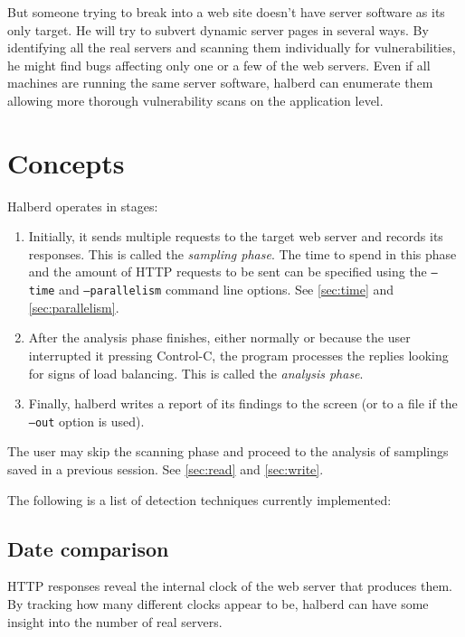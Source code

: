 \documentclass[a4paper]{book}
\begin{document}
But someone trying to break into a web site doesn't have server software as its
only target. He will try to subvert dynamic server pages in several ways.  By
identifying all the real servers and scanning them individually for
vulnerabilities, he might find bugs affecting only one or a few of the web
servers. Even if all machines are running the same server software, halberd can
enumerate them allowing more thorough vulnerability scans on the application
level.

\chapter{Concepts}

Halberd operates in stages:

\begin{enumerate}
  \item Initially, it sends multiple requests to the target web server and
  records its responses.  This is called the \emph{sampling phase}.  The time
  to spend in this phase and the amount of HTTP requests to be sent can be
  specified using the \texttt{--time} and \texttt{--parallelism} command line
  options.  See \ref{sec:time} and \ref{sec:parallelism}.

  \item After the analysis phase finishes, either normally or because the user
  interrupted it pressing Control-C, the program processes the replies looking
  for signs of load balancing.  This is called the \emph{analysis phase}.

  \item Finally, halberd writes a report of its findings to the screen (or to a
  file if the \texttt{--out} option is used).
\end{enumerate}

The user may skip the scanning phase and proceed to the analysis of samplings
saved in a previous session. See \ref{sec:read} and \ref{sec:write}.

The following is a list of detection techniques currently implemented:

\section{Date comparison}

HTTP responses reveal the internal clock of the web server that produces them.
By tracking how many different clocks appear to be, halberd can have some
insight into the number of real servers.
\end{document}
